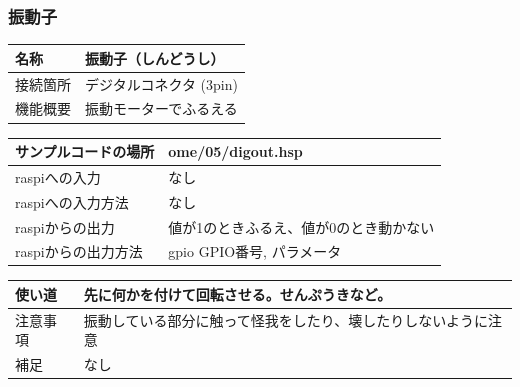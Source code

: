 \subsubsection{振動子}\label{vibrator}
\begin{table}[H]
	\begin{tabular}{|p{\colF}|p{\colG}|}	\hline
	名称 & 振動子（しんどうし）\\ \hline
	接続箇所 & デジタルコネクタ (3pin)\\ \hline
	機能概要 & 振動モーターでふるえる\\ \hline
  \end{tabular}
\end{table}

\begin{table}[H]
	\begin{tabular}{|p{\colF}|p{\colG}|}	\hline
	サンプルコードの場所 & ome/05/digout.hsp\\ \hline
	raspiへの入力 & なし\\ \hline
	raspiへの入力方法 & なし\\ \hline
	raspiからの出力 & 値が1のときふるえ、値が0のとき動かない\\ \hline
	raspiからの出力方法 & gpio GPIO番号, パラメータ\\ \hline
  \end{tabular}
\end{table}

\begin{table}[H]
	\begin{tabular}{|p{\colF}|p{\colG}|} \hline
	使い道 & 先に何かを付けて回転させる。せんぷうきなど。\\ \hline
	注意事項 & 振動している部分に触って怪我をしたり、壊したりしないように注意\\ \hline
	補足 & なし\\ \hline
  \end{tabular}
\end{table}

